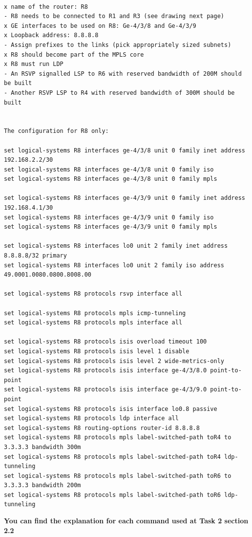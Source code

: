 \documentclass[a4paper]{article}
\begin{document}
\begin{verbatim}

x name of the router: R8
- R8 needs to be connected to R1 and R3 (see drawing next page)
x GE interfaces to be used on R8: Ge-4/3/8 and Ge-4/3/9
x Loopback address: 8.8.8.8
- Assign prefixes to the links (pick appropriately sized subnets)
x R8 should become part of the MPLS core
x R8 must run LDP
- An RSVP signalled LSP to R6 with reserved bandwidth of 200M should be built
- Another RSVP LSP to R4 with reserved bandwidth of 300M should be built


The configuration for R8 only:

set logical-systems R8 interfaces ge-4/3/8 unit 0 family inet address 192.168.2.2/30
set logical-systems R8 interfaces ge-4/3/8 unit 0 family iso
set logical-systems R8 interfaces ge-4/3/8 unit 0 family mpls

set logical-systems R8 interfaces ge-4/3/9 unit 0 family inet address 192.168.4.1/30
set logical-systems R8 interfaces ge-4/3/9 unit 0 family iso
set logical-systems R8 interfaces ge-4/3/9 unit 0 family mpls

set logical-systems R8 interfaces lo0 unit 2 family inet address 8.8.8.8/32 primary
set logical-systems R8 interfaces lo0 unit 2 family iso address 49.0001.0080.0800.8008.00

set logical-systems R8 protocols rsvp interface all

set logical-systems R8 protocols mpls icmp-tunneling
set logical-systems R8 protocols mpls interface all

set logical-systems R8 protocols isis overload timeout 100
set logical-systems R8 protocols isis level 1 disable
set logical-systems R8 protocols isis level 2 wide-metrics-only
set logical-systems R8 protocols isis interface ge-4/3/8.0 point-to-point
set logical-systems R8 protocols isis interface ge-4/3/9.0 point-to-point
set logical-systems R8 protocols isis interface lo0.8 passive
set logical-systems R8 protocols ldp interface all
set logical-systems R8 routing-options router-id 8.8.8.8
set logical-systems R8 protocols mpls label-switched-path toR4 to 3.3.3.3 bandwidth 300m
set logical-systems R8 protocols mpls label-switched-path toR4 ldp-tunneling
set logical-systems R8 protocols mpls label-switched-path toR6 to 3.3.3.3 bandwidth 200m
set logical-systems R8 protocols mpls label-switched-path toR6 ldp-tunneling
\end{verbatim}

\textbf{You can find the explanation for each command used at Task 2 section 2.2}
\end{document}
